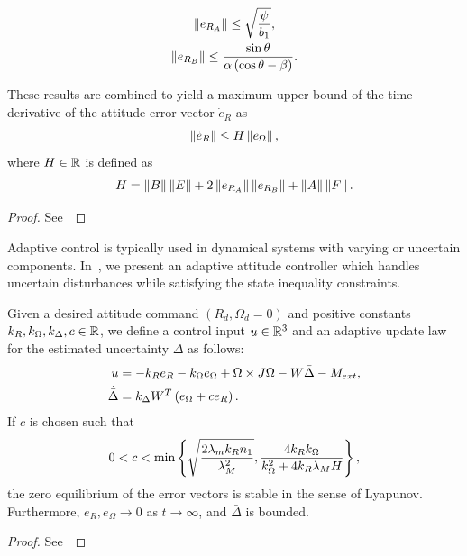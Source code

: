 \begin{prop}
\begin{enumerate}
        \begin{gather}
            \left\| e_{R_A} \right\| \leq \sqrt{\frac{\psi}{b_1}}, \label{eqn:eRA_bound} \\
            \left\| e_{R_B} \right\| \leq \frac{\sin\theta}{\alpha \left( \cos \theta - \beta \right)}. \label{eqn:eRB_bound}
        \end{gather}
\end{enumerate}
These results are combined to yield a maximum upper bound of the time derivative of the attitude error vector \( \dot{e}_R \) as
\begin{gather}
	\left\| \dot{e}_R \right\| \leq H \left\| e_\Omega \right\| ,\label{eqn:eR_bound}
\end{gather}
where  \( H \in \mathbb{R} \) is defined as
\begin{gather}
	H = \left\| B \right\| \left\| E \right\| + 2 \left\| e_{R_A} \right\| \left\| e_{R_B} \right\| + \left\| A \right\|\left\| F \right\|. \label{eqn:H}
\end{gather}
\end{prop}
\begin{proof}
See~
\end{proof}

Adaptive control is typically used in dynamical systems with varying or uncertain components.
In~, we present an adaptive attitude controller which handles uncertain disturbances while satisfying the state inequality constraints.
\begin{prop}\label{prop:adaptive_control}
Given  a desired attitude command \( (R_d, \Omega_d = 0 )\) and positive constants \( k_R, k_\Omega, k_\Delta, c \in \mathbb{R} \), we define a control input \( u \in \mathbb{R}^3\) and an adaptive update law for the estimated uncertainty \( \bar{\Delta} \) as follows:
\begin{align}
    u &= - k_R e_R - k_\Omega e_\Omega + \Omega \times J \Omega - W \bar{\Delta} - M_{ext} , \label{eqn:adaptive_control} \\
	\dot{\bar{\Delta}} &= k_\Delta W^T \left( e_\Omega + c e_R \right) . \label{eqn:delta_dot}
\end{align}
If \( c \) is chosen such that
\begin{gather}
	0 < c < \min \left\{ \sqrt{\frac{2 \lambda_m k_R n_1}{\lambda_M^2}},
	\frac{4 k_R k_\Omega}{k_\Omega^2 + 4 k_R \lambda_M H} \right\} , \label{eqn:c_bound}
\end{gather}
  the zero equilibrium of the error vectors is stable in the sense of Lyapunov. Furthermore, $e_R,e_\Omega\rightarrow 0$ as $t\rightarrow\infty$, and $\bar\Delta$ is  bounded.
\end{prop}
\begin{proof}
See~
\end{proof}

